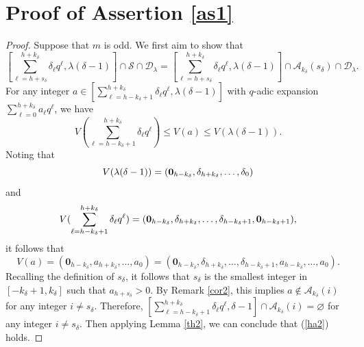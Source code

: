 \documentclass[journal,onecolumn]{IEEEtran}
\begin{document}
\section{Proof of Assertion \ref{as1}}\label{API}
\begin{proof}
Suppose that  $m$ is odd.  We first aim to  show that 
\begin{equation}\label{ha2}
\left[\sum\limits_{\ell=h+s_{\delta}}^{h+k_{\delta}}\delta_{\ell}q^{\ell}, \lambda(\delta-1)\right]\cap \mathcal{S}\cap \mathcal{D}_{\lambda}=\left[\sum\limits_{\ell=h+s_{\delta}}^{h+k_{\delta}}\delta_{\ell}q^{\ell}, \lambda(\delta-1)\right]\cap \mathcal{A}_{k_{\delta}}(s_{\delta}) \cap \mathcal{D}_{\lambda} .
\end{equation}
For any integer $a\in \left[\sum\limits_{\ell=h-k_{\delta}+1}^{h+k_{\delta}}\delta_{\ell}q^{\ell},\lambda(\delta-1)\right]$  with $q$-adic expansion $\sum\limits_{\ell=0}^{h+k_{\delta}}a_{\ell}q^{\ell}$, we have 
\begin{equation*}V(\sum\limits_{\ell=h-k_{\delta}+1}^{h+k_{\delta}}\delta_{\ell}q^{\ell})\leq V(a)\leq V(\lambda(\delta-1)). \end{equation*}
Noting that 
\begin{equation}\notag
V(\lambda(\delta-1))=(\mathbf{0}_{h-k_{\delta}},\delta_{h+k_{\delta}},\ldots,\delta_{0})
\end{equation}
and 
\begin{equation}\notag
V(\sum\limits_{\ell=h-k_{\delta}+1}^{h+k_{\delta}}\delta_{\ell}q^{\ell})=(\mathbf{0}_{h-k_{\delta}},\delta_{h+k_{\delta}},\ldots,\delta_{h-k_{\delta}+1}, \mathbf{0}_{h-k_{\delta}+1}), 
\end{equation}
it follows that  \begin{equation}\label{vvv}
V(a)=(\mathbf{0}_{h-k_{\delta}},a_{h+k_{\delta}},\ldots,a_0)=(\mathbf{0}_{h-k_{\delta}},\delta_{h+k_{\delta}},\ldots,\delta_{h-k_{\delta}+1} , a_{h-k_{\delta}},\ldots,a_0).
\end{equation}
Recalling the definition of  $s_{\delta}$,   it follows that $s_{\delta}$ is  the smallest integer in $[-k_{\delta}+1,k_{\delta}]$ such that $a_{h+s_{\delta}}>0$.  
 By Remark  \ref{cor2},  this implies  $a\not \in \mathcal{A}_{k_{\delta}}(i)$ for any integer $i\neq s_{\delta}$.  Therefore, 
$\left[\sum\limits_{\ell=h-k_{\delta}+1}^{h+k_{\delta}}\delta_{\ell}q^{\ell},\delta-1\right]\cap \mathcal{A}_{k_{\delta}}(i)=\varnothing$ for any integer $i\neq s_{\delta}.$  Then applying  Lemma  \ref{th2},  we can conclude that  (\ref{ha2}) holds.  


\end{proof}
\end{document}
